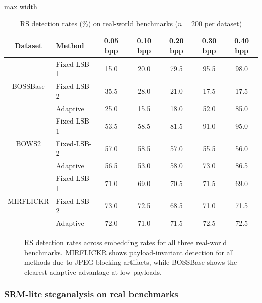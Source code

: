 \begin{table}[H]
\centering
\caption{RS detection rates (\%) on real-world benchmarks ($n = 200$ per dataset)}
\label{tab:rs_real}
\begin{adjustbox}{max width=\textwidth}
\begin{tabular}{clccccc}
\toprule
Dataset & Method & 0.05 bpp & 0.10 bpp & 0.20 bpp & 0.30 bpp & 0.40 bpp \\
\midrule
\multirow{3}{*}{BOSSBase}  & Fixed-LSB-1 & 15.0 & 20.0 & 79.5 & 95.5 & 98.0 \\
                            & Fixed-LSB-2 & 35.5 & 28.0 & 21.0 & 17.5 & 17.5 \\
                            & Adaptive    & 25.0 & 15.5 & 18.0 & 52.0 & 85.0 \\
\midrule
\multirow{3}{*}{BOWS2}     & Fixed-LSB-1 & 53.5 & 58.5 & 81.5 & 91.0 & 95.0 \\
                            & Fixed-LSB-2 & 57.0 & 58.5 & 57.0 & 55.5 & 56.0 \\
                            & Adaptive    & 56.5 & 53.0 & 58.0 & 73.0 & 86.5 \\
\midrule
\multirow{3}{*}{MIRFLICKR} & Fixed-LSB-1 & 71.0 & 69.0 & 70.5 & 71.5 & 69.0 \\
                            & Fixed-LSB-2 & 73.0 & 72.5 & 68.5 & 71.0 & 71.5 \\
                            & Adaptive    & 72.0 & 71.0 & 71.5 & 72.5 & 72.5 \\
\bottomrule
\end{tabular}
\end{adjustbox}
\end{table}

\begin{figure}[H]
    \centering
    \caption{RS detection rates across embedding rates for all three real-world benchmarks. MIRFLICKR shows payload-invariant detection for all methods due to JPEG blocking artifacts, while BOSSBase shows the clearest adaptive advantage at low payloads.}
    \label{fig:real_rs}
\end{figure}

\subsubsection{SRM-lite steganalysis on real benchmarks}
\label{sec:srm_real}


